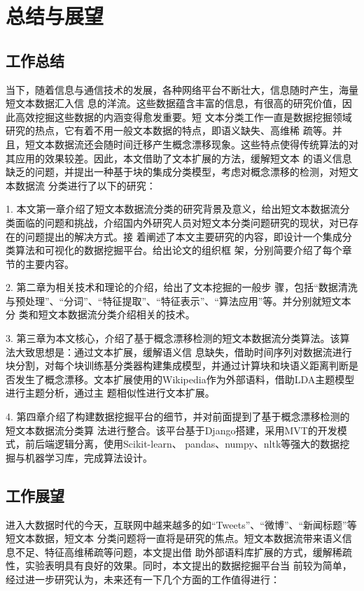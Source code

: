 
\chapter{总结与展望}

\section{工作总结}
当下，随着信息与通信技术的发展，各种网络平台不断壮大，信息随时产生，海量短文本数据汇入信
息的洋流。这些数据蕴含丰富的信息，有很高的研究价值，因此高效挖掘这些数据的内涵变得愈发重要。短
文本分类工作一直是数据挖掘领域研究的热点，它有着不用一般文本数据的特点，即语义缺失、高维稀
疏等。并且，短文本数据流还会随时间迁移产生概念漂移现象。这些特点使得传统算法的对其应用的效果较差。因此，本文借助了文本扩展的方法，缓解短文本
的语义信息缺乏的问题，并提出一种基于块的集成分类模型，考虑对概念漂移的检测，对短文本数据流
分类进行了以下的研究：

1. 本文第一章介绍了短文本数据流分类的研究背景及意义，给出短文本数据流分类面临的问题和挑战，介绍国内外研究人员对短文本分类问题研究的现状，对已存在的问题提出的解决方式。接
着阐述了本文主要研究的内容，即设计一个集成分类算法和可视化的数据挖掘平台。给出论文的组织框
架，分别简要介绍了每个章节的主要内容。

2. 第二章为相关技术和理论的介绍，给出了文本挖掘的一般步
骤，包括“数据清洗与预处理”、“分词”、“特征提取”、“特征表示”、“算法应用”等。并分别就短文本分
类和短文本数据流分类介绍相关的技术。

3. 第三章为本文核心，介绍了基于概念漂移检测的短文本数据流分类算法。该算法大致思想是：通过文本扩展，缓解语义信
息缺失，借助时间序列对数据流进行块分割，对每个块训练基分类器构建集成模型，并通过计算块和块语义距离判断是
否发生了概念漂移。文本扩展使用的Wikipedia作为外部语料，借助LDA主题模型进行主题分析，通过主
题相似性进行文本扩展。

4. 第四章介绍了构建数据挖掘平台的细节，并对前面提到了基于概念漂移检测的短文本数据流分类算
法进行整合。该平台基于Django搭建，采用MVT的开发模式，前后端逻辑分离，使用Scikit-learn、
pandas、numpy、nltk等强大的数据挖掘与机器学习库，完成算法设计。

\section{工作展望}
进入大数据时代的今天，互联网中越来越多的如“Tweets”、“微博”、“新闻标题”等短文本数据，短文本
分类问题将一直将是研究的焦点。短文本数据流带来语义信息不足、特征高维稀疏等问题，本文提出借
助外部语料库扩展的方式，缓解稀疏性，实验表明具有良好的效果。同时，本文提出的数据挖掘平台当
前较为简单，经过进一步研究认为，未来还有一下几个方面的工作值得进行：

